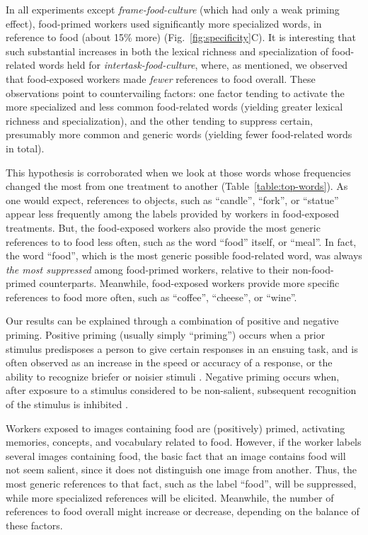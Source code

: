 \documentclass{pnastwo}
\begin{document}
\begin{article}
In all experiments except \textit{frame-food-culture} (which had only a weak
priming effect), food-primed workers used significantly more
specialized words, in reference to food (about 15\% more)
(Fig.~\ref{fig:specificity}C).  It is interesting that such substantial
increases in both the lexical richness and specialization of food-related words
held for \textit{intertask-food-culture}, where, as mentioned, we observed that
food-exposed workers made \textit{fewer} references to food overall.  These
observations point to countervailing factors: one factor tending to activate
the more specialized and less common food-related words (yielding greater
lexical richness and specialization), and the other tending to suppress
certain, presumably more common and generic words (yielding fewer food-related
words in total).

This hypothesis is corroborated when we look at those words whose frequencies
changed the most from one treatment to another (Table~\ref{table:top-words}).
As one would expect, references to objects, such as ``candle'', ``fork'', 
or ``statue'' appear less frequently among the labels provided by workers in 
food-exposed treatments.  But, the food-exposed workers also provide the most
generic references to to food less often, such as the word ``food'' itself, 
or ``meal''.  
In fact, the word ``food'', which is the most generic possible food-related 
word, was always \textit{the most suppressed} among food-primed workers, 
relative to their non-food-primed counterparts.  
Meanwhile, food-exposed workers provide more specific references to food more 
often, such as ``coffee'', ``cheese'', or ``wine''.


Our results can be explained through a combination of positive and negative
priming.  Positive priming (usually simply ``priming'') occurs when a prior
stimulus predisposes a person to give certain responses in an ensuing task, and
is often observed as an increase in the speed or accuracy of a response, or the
ability to recognize briefer or noisier stimuli
\cite{BJOP1796,BJOP1826,Huber2008324}.  Negative priming occurs when, after
exposure to a stimulus considered to be non-salient, subsequent recognition of
the stimulus is inhibited \cite{mayr2007negative}.

Workers exposed to images containing food are (positively) primed, activating
memories, concepts, and vocabulary related to food.  However, if the worker
labels several images containing food, the basic fact that an image contains
food will not seem salient, since it does not distinguish one image from
another.  Thus, the most generic references to that fact, such as the label
``food'', will be suppressed, while more specialized references will be
elicited.  Meanwhile, the number of references to food overall might increase
or decrease, depending on the balance of these factors.  


\end{article}
\end{document}
